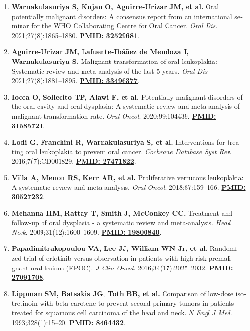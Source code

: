 \documentclass[a4paper]{article}
\begin{document}
\begin{latin}
\small
\begin{enumerate}
    \item \textbf{Warnakulasuriya S, Kujan O, Aguirre-Urizar JM, et al.} Oral potentially malignant disorders: A consensus report from an international seminar for the WHO Collaborating Centre for Oral Cancer. \textit{Oral Dis}. 2021;27(8):1865--1880. \href{https://pubmed.ncbi.nlm.nih.gov/32529681/}{\textbf{PMID: 32529681}}.
    \item \textbf{Aguirre-Urizar JM, Lafuente-Ibáñez de Mendoza I, Warnakulasuriya S.} Malignant transformation of oral leukoplakia: Systematic review and meta-analysis of the last 5 years. \textit{Oral Dis}. 2021;27(8):1881--1895. \href{https://pubmed.ncbi.nlm.nih.gov/33496377/}{\textbf{PMID: 33496377}}.
    \item \textbf{Iocca O, Sollecito TP, Alawi F, et al.} Potentially malignant disorders of the oral cavity and oral dysplasia: A systematic review and meta-analysis of malignant transformation rate. \textit{Oral Oncol}. 2020;99:104439. \href{https://pubmed.ncbi.nlm.nih.gov/31585721/}{\textbf{PMID: 31585721}}.
    \item \textbf{Lodi G, Franchini R, Warnakulasuriya S, et al.} Interventions for treating oral leukoplakia to prevent oral cancer. \textit{Cochrane Database Syst Rev}. 2016;7(7):CD001829. \href{https://pubmed.ncbi.nlm.nih.gov/27471822/}{\textbf{PMID: 27471822}}.
    \item \textbf{Villa A, Menon RS, Kerr AR, et al.} Proliferative verrucous leukoplakia: A systematic review and meta-analysis. \textit{Oral Oncol}. 2018;87:159--166. \href{https://pubmed.ncbi.nlm.nih.gov/30527232/}{\textbf{PMID: 30527232}}.
    \item \textbf{Mehanna HM, Rattay T, Smith J, McConkey CC.} Treatment and follow-up of oral dysplasia - a systematic review and meta-analysis. \textit{Head Neck}. 2009;31(12):1600--1609. \href{https://pubmed.ncbi.nlm.nih.gov/19800840/}{\textbf{PMID: 19800840}}.
    \item \textbf{Papadimitrakopoulou VA, Lee JJ, William WN Jr, et al.} Randomized trial of erlotinib versus observation in patients with high-risk premalignant oral lesions (EPOC). \textit{J Clin Oncol}. 2016;34(17):2025--2032. \href{https://pubmed.ncbi.nlm.nih.gov/27091708/}{\textbf{PMID: 27091708}}.
    \item \textbf{Lippman SM, Batsakis JG, Toth BB, et al.} Comparison of low-dose isotretinoin with beta carotene to prevent second primary tumors in patients treated for squamous cell carcinoma of the head and neck. \textit{N Engl J Med}. 1993;328(1):15--20. \href{https://pubmed.ncbi.nlm.nih.gov/8464432/}{\textbf{PMID: 8464432}}.

\end{enumerate}
\end{latin}
\end{document}
